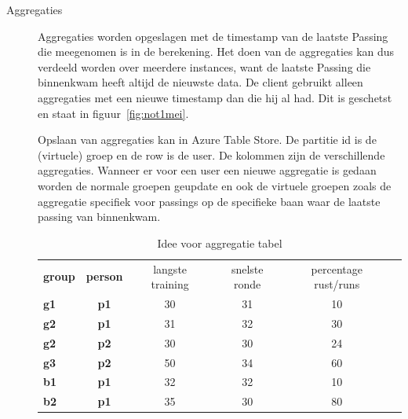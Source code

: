 \begin{description}
\item[Aggregaties] Aggregaties worden opgeslagen met de timestamp van de laatste Passing die meegenomen is in de berekening. Het doen van de aggregaties kan dus verdeeld worden over meerdere instances, want de laatste Passing die binnenkwam heeft altijd de nieuwste data. De client gebruikt alleen aggregaties met een nieuwe timestamp dan die hij al had. Dit is geschetst en staat in figuur~\ref{fig:not1mei}.

Opslaan van aggregaties kan in Azure Table Store. De partitie id is de (virtuele) groep en de row is de user. De kolommen zijn de verschillende aggregaties. Wanneer er voor een user een nieuwe aggregatie is gedaan worden de normale groepen geupdate en ook de virtuele groepen zoals de aggregatie specifiek voor passings op de specifieke baan waar de laatste passing van binnenkwam.

\begin{table}
\begin{tabular}{lccccc}
\centering
\textbf{group  } & \textbf{ person } & langste training & snelste ronde & percentage rust/runs \\
\textbf{g1     } & \textbf{ p1     } & 30               & 31            & 10 \\
\textbf{g2     } & \textbf{ p1     } & 31               & 32            & 30 \\
\textbf{g2     } & \textbf{ p2     } & 30               & 30            & 24 \\
\textbf{g3     } & \textbf{ p2     } & 50               & 34            & 60 \\
\textbf{b1     } & \textbf{ p1     } & 32               & 32            & 10 \\
\textbf{b2     } & \textbf{ p1     } & 35               & 30            & 80 \\
\end{tabular}
\label{tab:tablestore} 
\caption{Idee voor aggregatie tabel}
\end{table}

\end{description}